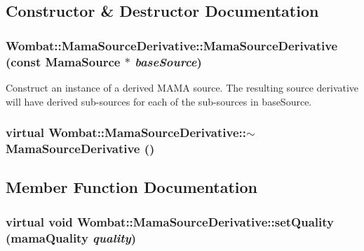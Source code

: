 \subsection{Constructor \& Destructor Documentation}
\hypertarget{classWombat_1_1MamaSourceDerivative_af74ddda87ac625872d9343e45a9db14b}{
\subsubsection[{MamaSourceDerivative}]{\setlength{\rightskip}{0pt plus 5cm}Wombat::MamaSourceDerivative::MamaSourceDerivative (const {\bf MamaSource} $\ast$ {\em baseSource})}}
\label{classWombat_1_1MamaSourceDerivative_af74ddda87ac625872d9343e45a9db14b}


Construct an instance of a derived MAMA source. The resulting source derivative will have derived sub-\/sources for each of the sub-\/sources in baseSource. \hypertarget{classWombat_1_1MamaSourceDerivative_a26db36a75f3c011702b4eb8bfb3e06c8}{
\subsubsection[{$\sim$MamaSourceDerivative}]{\setlength{\rightskip}{0pt plus 5cm}virtual Wombat::MamaSourceDerivative::$\sim$MamaSourceDerivative ()}}
\label{classWombat_1_1MamaSourceDerivative_a26db36a75f3c011702b4eb8bfb3e06c8}


\subsection{Member Function Documentation}
\hypertarget{classWombat_1_1MamaSourceDerivative_aef1c1007d75a298118d421aea1467230}{
\subsubsection[{setQuality}]{\setlength{\rightskip}{0pt plus 5cm}virtual void Wombat::MamaSourceDerivative::setQuality (mamaQuality {\em quality})}}
\label{classWombat_1_1MamaSourceDerivative_aef1c1007d75a298118d421aea1467230}


